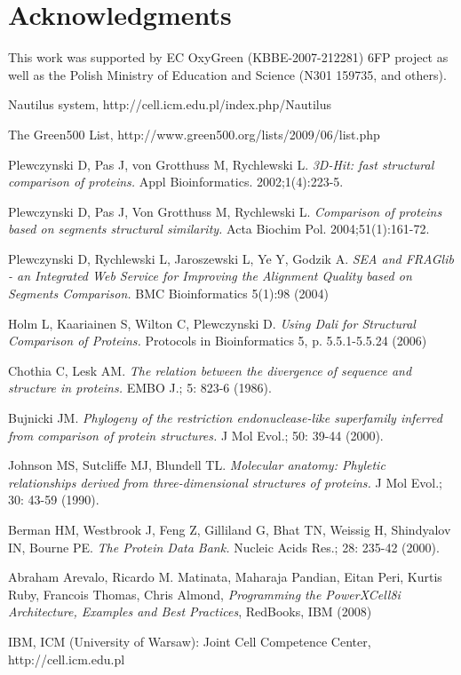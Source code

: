 \section{Acknowledgments}
This work was supported by EC OxyGreen (KBBE-2007-212281) 6FP project as
well as the Polish Ministry of Education and Science (N301 159735,
and others).

\begin{thebibliography}{99}

 Nautilus system,
http://cell.icm.edu.pl/index.php/Nautilus

 The Green500 List,
http://www.green500.org/lists/2009/06/list.php

 Plewczynski D, Pas J, von Grotthuss M, Rychlewski L.
\textit{3D-Hit: fast structural comparison of proteins.}
Appl Bioinformatics. 2002;1(4):223-5.

  Plewczynski D, Pas J, Von Grotthuss M, Rychlewski L.
\textit{Comparison of proteins based on segments structural similarity.}
Acta Biochim Pol. 2004;51(1):161-72.

 Plewczynski D, Rychlewski L, Jaroszewski L, Ye Y, Godzik A.
\textit{SEA and FRAGlib - an Integrated Web Service for Improving the Alignment Quality based on Segments Comparison.} 
BMC Bioinformatics 5(1):98 (2004)

 Holm L, Kaariainen S, Wilton C, Plewczynski D.
\textit{Using Dali for Structural Comparison of Proteins.}
Protocols in Bioinformatics 5, p. 5.5.1-5.5.24 (2006)

 Chothia C, Lesk AM. \textit{The relation between the
divergence of sequence and structure in proteins.} EMBO J.; 5: 823-6 (1986).

 Bujnicki JM. \textit{Phylogeny of the restriction
endonuclease-like superfamily inferred from comparison of protein structures.}
J Mol Evol.; 50: 39-44 (2000).

 Johnson MS, Sutcliffe MJ, Blundell TL. \textit{Molecular
anatomy: Phyletic relationships derived from three-dimensional structures of
proteins.} J Mol Evol.; 30: 43-59 (1990).

 Berman HM, Westbrook J, Feng Z, Gilliland G, Bhat TN,
Weissig H, Shindyalov IN, Bourne PE. \textit{The Protein Data Bank.}
Nucleic Acids Res.; 28: 235-42 (2000).

 Abraham Arevalo, Ricardo M. Matinata, Maharaja Pandian,
Eitan Peri, Kurtis Ruby, Francois Thomas, Chris Almond,
\textit{Programming the PowerXCell8i Architecture, Examples and Best Practices},
RedBooks, IBM (2008)

 IBM, ICM (University of Warsaw):
Joint Cell Competence Center, http://cell.icm.edu.pl




\end{thebibliography}


